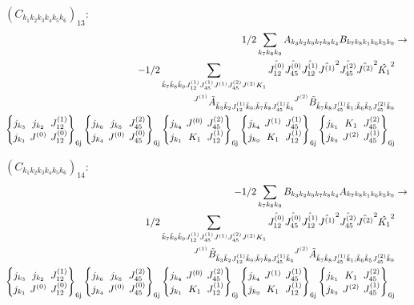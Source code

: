 \documentclass[11pt]{article}
\newcommand{\sixj}[6]{\begingroup\setlength{\arraycolsep}{0.2em}\begin{Bmatrix} #1 & #2 & #3 \\ #4 & #5 & #6 \end{Bmatrix}_{\text{6j}}\endgroup}
\begin{document}
$\left({C}_{{k}_{1}{k}_{2}{k}_{3}{k}_{4}{k}_{5}{k}_{6}}\right)_{13}$:
\begin{align}
1/2\sum_{{k}_{7}{k}_{8}{k}_{9}}{A}_{{k}_{3}{k}_{2}{k}_{9}{k}_{7}{k}_{8}{k}_{4}}{B}_{{k}_{7}{k}_{8}{k}_{1}{k}_{6}{k}_{5}{k}_{9}}&\rightarrow \notag \\-1/2\sum_{\tilde{k}_{7}\tilde{k}_{8}\tilde{k}_{9}J^{(1)}_{12}J^{(1)}_{45}J^{(1)}J^{(2)}_{45}J^{(2)}K_{1}}\hat{J^{(0)}_{12}}\hat{J^{(0)}_{45}}\hat{J^{(1)}_{12}}\hat{J^{(1)}}^{2}\hat{J^{(2)}_{45}}\hat{J^{(2)}}^{2}\hat{K_{1}}^{2}& \notag \\{}^{J^{(1)}}\tilde{A}_{\tilde{k}_{3}\tilde{k}_{2}J^{(1)}_{12}\tilde{k}_{9};\tilde{k}_{7}\tilde{k}_{8}J^{(1)}_{45}\tilde{k}_{4}}{}^{J^{(2)}}\tilde{B}_{\tilde{k}_{7}\tilde{k}_{8}J^{(1)}_{45}\tilde{k}_{1};\tilde{k}_{6}\tilde{k}_{5}J^{(2)}_{45}\tilde{k}_{9}}& \notag \\\sixj{j_{{k}_{3}}}{j_{{k}_{2}}}{J^{(1)}_{12}}{j_{{k}_{1}}}{J^{(0)}}{J^{(0)}_{12}}\sixj{j_{{k}_{6}}}{j_{{k}_{5}}}{J^{(2)}_{45}}{j_{{k}_{4}}}{J^{(0)}}{J^{(0)}_{45}}\sixj{j_{{k}_{4}}}{J^{(0)}}{J^{(2)}_{45}}{j_{{k}_{1}}}{K_{1}}{J^{(1)}_{12}}\sixj{j_{{k}_{4}}}{J^{(1)}}{J^{(1)}_{45}}{j_{{k}_{9}}}{K_{1}}{J^{(1)}_{12}}\sixj{j_{{k}_{1}}}{K_{1}}{J^{(2)}_{45}}{j_{{k}_{9}}}{J^{(2)}}{J^{(1)}_{45}}
\end{align}

$\left({C}_{{k}_{1}{k}_{2}{k}_{3}{k}_{4}{k}_{5}{k}_{6}}\right)_{14}$:
\begin{align}
-1/2\sum_{{k}_{7}{k}_{8}{k}_{9}}{B}_{{k}_{3}{k}_{2}{k}_{9}{k}_{7}{k}_{8}{k}_{4}}{A}_{{k}_{7}{k}_{8}{k}_{1}{k}_{6}{k}_{5}{k}_{9}}&\rightarrow \notag \\1/2\sum_{\tilde{k}_{7}\tilde{k}_{8}\tilde{k}_{9}J^{(1)}_{12}J^{(1)}_{45}J^{(1)}J^{(2)}_{45}J^{(2)}K_{1}}\hat{J^{(0)}_{12}}\hat{J^{(0)}_{45}}\hat{J^{(1)}_{12}}\hat{J^{(1)}}^{2}\hat{J^{(2)}_{45}}\hat{J^{(2)}}^{2}\hat{K_{1}}^{2}& \notag \\{}^{J^{(1)}}\tilde{B}_{\tilde{k}_{3}\tilde{k}_{2}J^{(1)}_{12}\tilde{k}_{9};\tilde{k}_{7}\tilde{k}_{8}J^{(1)}_{45}\tilde{k}_{4}}{}^{J^{(2)}}\tilde{A}_{\tilde{k}_{7}\tilde{k}_{8}J^{(1)}_{45}\tilde{k}_{1};\tilde{k}_{6}\tilde{k}_{5}J^{(2)}_{45}\tilde{k}_{9}}& \notag \\\sixj{j_{{k}_{3}}}{j_{{k}_{2}}}{J^{(1)}_{12}}{j_{{k}_{1}}}{J^{(0)}}{J^{(0)}_{12}}\sixj{j_{{k}_{6}}}{j_{{k}_{5}}}{J^{(2)}_{45}}{j_{{k}_{4}}}{J^{(0)}}{J^{(0)}_{45}}\sixj{j_{{k}_{4}}}{J^{(0)}}{J^{(2)}_{45}}{j_{{k}_{1}}}{K_{1}}{J^{(1)}_{12}}\sixj{j_{{k}_{4}}}{J^{(1)}}{J^{(1)}_{45}}{j_{{k}_{9}}}{K_{1}}{J^{(1)}_{12}}\sixj{j_{{k}_{1}}}{K_{1}}{J^{(2)}_{45}}{j_{{k}_{9}}}{J^{(2)}}{J^{(1)}_{45}}
\end{align}
\end{document}
